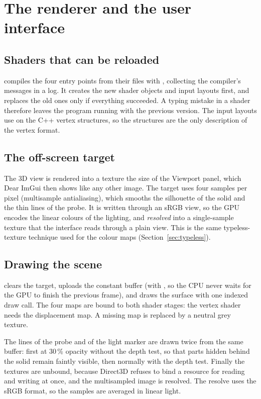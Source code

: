 \chapter{The renderer and the user interface}
\label{ch:renderer}

\section{Shaders that can be reloaded}
 compiles the four entry points from their files with
, collecting the compiler's messages in a log. It creates the new
shader objects and input layouts first, and replaces the old ones only if everything succeeded.
A typing mistake in a shader therefore leaves the program running with the previous version.
The input layouts use  on the C++ vertex structures, so the structures are the
only description of the vertex format.


\section{The off-screen target}
The 3D view is rendered into a texture the size of the Viewport panel, which Dear ImGui then
shows like any other image. The target uses four samples per pixel (multisample antialiasing),
which smooths the silhouette of the solid and the thin lines of the probe. It is written through
an sRGB view, so the GPU encodes the linear colours of the lighting, and \emph{resolved} into a
single-sample texture that the interface reads through a plain view. This is the same
typeless-texture technique used for the colour maps (Section~\ref{sec:typeless}).


\section{Drawing the scene}
 clears the target, uploads the constant buffer (with , so
the CPU never waits for the GPU to finish the previous frame), and draws the surface with one
indexed draw call. The four maps are bound to both shader stages: the vertex shader needs the
displacement map. A missing map is replaced by a neutral grey texture.

The lines of the probe and of the light marker are drawn twice from the same buffer: first at
30\,\% opacity without the depth test, so that parts hidden behind the solid remain faintly
visible, then normally with the depth test. Finally the textures are unbound, because Direct3D
refuses to bind a resource for reading and writing at once, and the multisampled image is
resolved. The resolve uses the sRGB format, so the samples are averaged in linear light.

